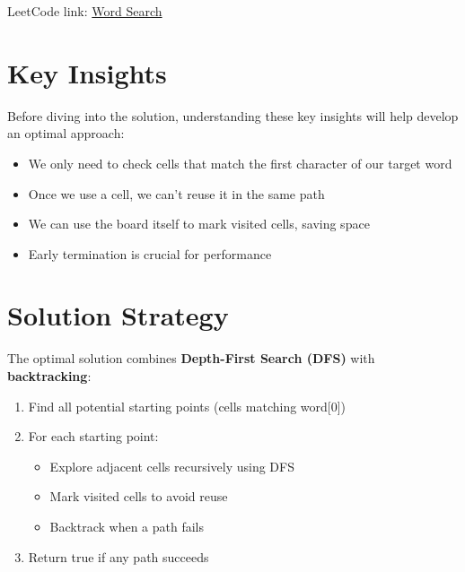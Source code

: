 LeetCode link: \href{https://leetcode.com/problems/word-search/}{Word Search}


\section*{Key Insights}
Before diving into the solution, understanding these key insights will help develop an optimal approach:

\begin{itemize}
    \item We only need to check cells that match the first character of our target word
    \item Once we use a cell, we can't reuse it in the same path
    \item We can use the board itself to mark visited cells, saving space
    \item Early termination is crucial for performance
\end{itemize}

\section*{Solution Strategy}
The optimal solution combines \textbf{Depth-First Search (DFS)} with \textbf{backtracking}:

\begin{enumerate}
    \item Find all potential starting points (cells matching word[0])
    \item For each starting point:
        \begin{itemize}
            \item Explore adjacent cells recursively using DFS
            \item Mark visited cells to avoid reuse
            \item Backtrack when a path fails
        \end{itemize}
    \item Return true if any path succeeds
\end{enumerate}

